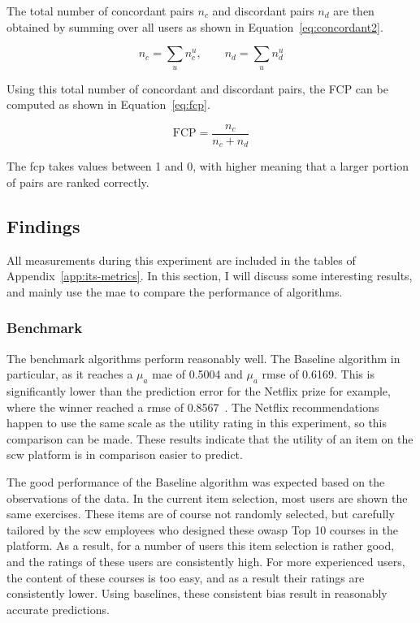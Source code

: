 The total number of concordant pairs $n_c$ and discordant pairs $n_d$ are then obtained by summing over all users as shown in Equation~\ref{eq:concordant2}.

\begin{equation}
    \label{eq:concordant2}
    n_{c} = \sum\limits_{u} n_{c}^{u},\qquad n_{d} = \sum\limits_{u} n_{d}^{u}
\end{equation}

Using this total number of concordant and discordant pairs, the FCP can be computed as shown in Equation~\ref{eq:fcp}.

\begin{equation}
    \label{eq:fcp}
    \text{FCP} = \frac{n_{c}}{n_{c} + n_{d}}
\end{equation}

The \gls{fcp} takes values between 1 and 0, with higher meaning that a larger portion of pairs are ranked correctly.


\subsection{Findings}
All measurements during this experiment are included in the tables of Appendix~\ref{app:its-metrics}.
In this section, I will discuss some interesting results, and mainly use the \gls{mae} to compare the performance of algorithms.

\subsubsection{Benchmark}
The benchmark algorithms perform reasonably well.
The Baseline algorithm in particular, as it reaches a $\mu_a$ \gls{mae} of 0.5004 and $\mu_a$ \gls{rmse} of 0.6169.
This is significantly lower than the prediction error for the Netflix prize for example, where the winner reached a \gls{rmse} of 0.8567~\cite{zhou2008large,netflixprizeforum,netflixprizeleaderboard}. 
The Netflix recommendations happen to use the same scale as the utility rating in this experiment, so this comparison can be made.
These results indicate that the utility of an item on the \gls{scw} platform is in comparison easier to predict.

The good performance of the Baseline algorithm was expected based on the observations of the data.
In the current item selection, most users are shown the same exercises.
These items are of course not randomly selected, but carefully tailored by the \gls{scw} employees who designed these \gls{owasp} Top 10 courses in the platform.
As a result, for a number of users this item selection is rather good, and the ratings of these users are consistently high.
For more experienced users, the content of these courses is too easy, and as a result their ratings are consistently lower.
Using baselines, these consistent bias result in reasonably accurate predictions.

